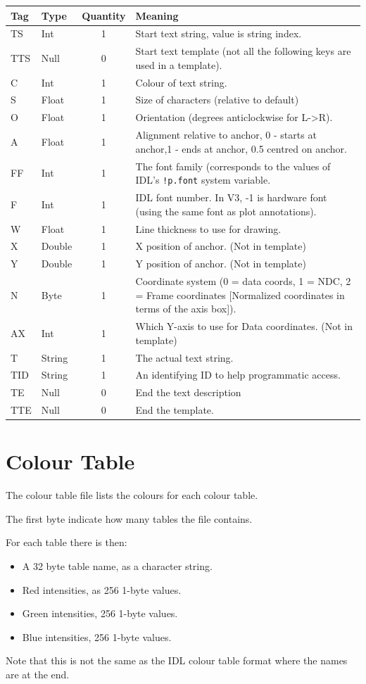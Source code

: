 \documentclass[english]{article}
\begin{document}
\begin{longtable}{|llcp{8cm}|}
\hline 
Tag&
Type&
Quantity&
Meaning\\
\hline
\endhead
\hline
\endfoot
TS& Int& 1&
Start text string, value is string index.\\
TTS& Null& 0&
Start text template (not all the following keys are used in a template).\\
\hline C& Int& 1&
Colour of text string.\\
S& Float& 1&
Size of characters (relative to default)\\
O& Float& 1&
Orientation (degrees anticlockwise for L->R).\\
A& Float& 1& Alignment relative to anchor, 0 - starts at anchor,1 -
ends at anchor,
0.5 centred on anchor.\\
FF & Int & 1 & The font family (corresponds to the values of IDL's
\texttt{!p.font} system variable.\\
F& Int& 1&
IDL font number. In V3, -1 is hardware font (using the same font as
plot annotations).\\
W& Float& 1&
Line thickness to use for drawing.\\
X& Double& 1&
X position of anchor. (Not in template)\\
Y& Double& 1&
Y position of anchor. (Not in template)\\
N& Byte& 1& Coordinate system (0 = data coords, 1 = NDC, 2 = Frame coordinates
[Normalized coordinates in terms of the axis box]).\\
AX & Int & 1 & Which Y-axis to use for Data coordinates. (Not in template)\\
T& String& 1&
The actual text string.\\
TID & String & 1 & An identifying ID to help programmatic access.\\
\hline TE& Null& 0&
End the text description\\
TTE& Null& 0&
End the template.\\
\end{longtable}

\section{Colour Table}
\label{sec:colour_table}

The colour table file lists the colours for each colour table. 

The first byte indicate how many tables the file contains.

For each table there is then:
\begin{itemize}
\item A 32 byte table name, as a character string.
\item Red intensities, as 256 1-byte values.
\item Green intensities, 256 1-byte values.
\item Blue intensities, 256 1-byte values.
\end{itemize}

Note that this is not the same as the IDL colour table format where the
names are at the end.
\end{document}
